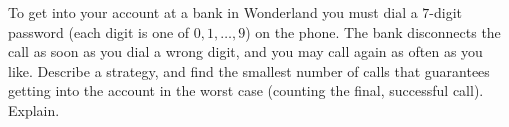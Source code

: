 To get into your account at a bank in Wonderland you must dial a $7$-digit password (each digit is one of $0,1,\dots,9$) on the phone. The bank disconnects the call as soon as you dial a wrong digit, and you may call again as often as you like. Describe a strategy, and find the smallest number of calls that guarantees getting into the account in the worst case (counting the final, successful call). Explain.
